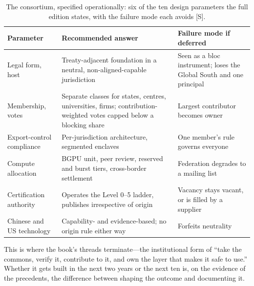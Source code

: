 \begin{table}[htbp]
\centering\footnotesize
\caption{The consortium, specified operationally: six of the ten design parameters the full edition states, with the failure mode each avoids [S].}
\label{tab:consortium}
\begin{tabular}{@{}p{32mm}p{60mm}p{56mm}@{}}
\toprule
\textbf{Parameter} & \textbf{Recommended answer} & \textbf{Failure mode if deferred} \\
\midrule
Legal form, host & Treaty-adjacent foundation in a neutral, non-aligned-capable jurisdiction & Seen as a bloc instrument; loses the Global South and one principal \\
Membership, votes & Separate classes for states, centres, universities, firms; contribution-weighted votes capped below a blocking share & Largest contributor becomes owner \\
Export-control compliance & Per-jurisdiction architecture, segmented enclaves & One member's rule governs everyone \\
Compute allocation & BGPU unit, peer review, reserved and burst tiers, cross-border settlement & Federation degrades to a mailing list \\
Certification authority & Operates the Level 0--5 ladder, publishes irrespective of origin & Vacancy stays vacant, or is filled by a supplier \\
Chinese and US technology & Capability- and evidence-based; no origin rule either way & Forfeits neutrality \\
\bottomrule
\end{tabular}
\end{table}

This is where the book's threads terminate---the institutional form of ``take the commons, verify it, contribute to it, and own the layer that makes it safe to use.'' Whether it gets built in the next two years or the next ten is, on the evidence of the precedents, the difference between shaping the outcome and documenting it.
